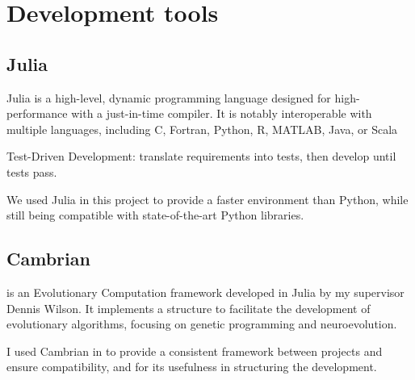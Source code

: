 \section{Development tools}
\subsection{Julia}
Julia is a high-level, dynamic programming language designed for high-performance with a just-in-time compiler. It is notably interoperable with multiple languages, including C, Fortran, Python, R, MATLAB, Java, or Scala

Test-Driven Development: translate requirements into tests, then develop until tests pass.

We used Julia in this project to provide a faster environment than Python, while still being compatible with state-of-the-art Python libraries.

\subsection{Cambrian}
\href{https://github.com/d9w/Cambrian.jl}{\color{blue}{Cambrian.jl}} is an Evolutionary Computation framework developed in Julia by my supervisor Dennis Wilson. It implements a structure to facilitate the development of evolutionary algorithms, focusing on genetic programming and neuroevolution. 

I used Cambrian in to provide a consistent framework between projects and ensure compatibility, and for its usefulness in structuring the development.

